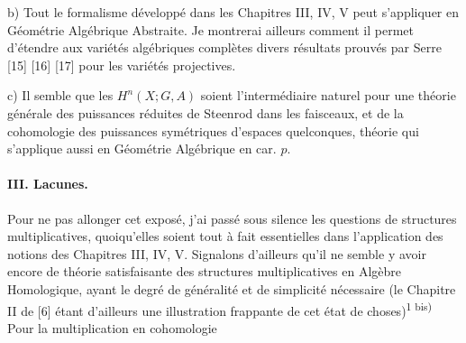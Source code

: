 \par b)
Tout le formalisme développé dans les Chapitres III, IV, V peut s'appliquer en
Géométrie Algébrique Abstraite. Je montrerai ailleurs comment il permet
d'étendre aux variétés algébriques complètes divers résultats prouvés par
Serre [15] [16] [17] pour les variétés projectives.

\par c)
Il semble que les $H^n(X;G,A)$ soient l'intermédiaire naturel pour une théorie
générale des puissances réduites de Steenrod dans les faisceaux, et de la
cohomologie des puissances symétriques d'espaces quelconques, théorie qui
s'applique aussi en Géométrie Algébrique en car. $p$.

\paragraph{III. Lacunes.}
Pour ne pas allonger cet exposé, j'ai passé sous silence les questions de
structures multiplicatives, quoiqu'elles soient tout à fait essentielles dans
l'application des notions des Chapitres III, IV, V. Signalons d'ailleurs qu'il
ne semble y avoir encore de théorie satisfaisante des structures
multiplicatives en Algèbre Homologique, ayant le degré de généralité et de
simplicité nécessaire (le Chapitre II de [6] étant d'ailleurs une illustration
frappante de cet état de choses)\textsuperscript{1 bis)} Pour la multiplication
en cohomologie

